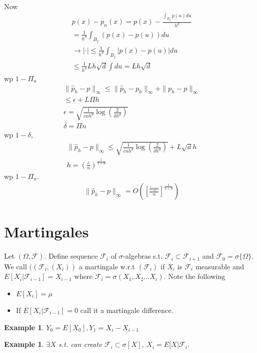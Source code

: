 \documentclass[10pt]{article}
\newtheorem{example}[ex]{Example}
\renewcommand{\hat}{\widehat}
\begin{document}
Now 
\begin{align*}
p(x) - p_{n}(x) = p(x) - \frac{\int_{B_{j}}p(u)du } {h^{d}} \\
                     = \frac{1}{h^{d}}\int_{B_{j}}(p(x) - p(u))du \\
\rightarrow |\cdot | \le \frac{1}{h^{d}}\int_{B_{j}}|p(x)-p(u)|du \\
\le \frac{1}{h^{d}}Lh\sqrt{d}\int du = Lh\sqrt{d}
\end{align*}
wp $1- \Pi_{n}$
\begin{align*}
\|\hat{p}_{h} - p \|_{\infty} \le \|\hat{p}_{h} - p_{h}\|_{\infty} + \| p_{h} - p \|_{\infty}\\ \le \epsilon + L\Pi h \\
\epsilon = \sqrt{ \frac{1}{cnh^{d}}\log(\frac{2}{\delta h^{d}})} \\
\delta = \Pi n
\end{align*}
wp $1- \delta$,
\begin{align*}
\|\hat{p}_{h} - p\|_{\infty} \le \sqrt{\frac{1}{cnh^{d}}\log(\frac{2}{\delta h^{d}})} + L\sqrt{d} h \\
h = (\frac{c}{n})^{\frac{1}{2+d}}
\end{align*}
wp $1 - \Pi_{n}$.
\begin{align*}
\|\hat{p}_{h} - p \|_{\infty} = O([\frac{log n}{n}]^{\frac{1}{2+d}})
\end{align*}

\section{Martingales}
Let $(\Omega, \mathscr{F})$. Define sequence $\mathscr{F}_{i}$ of $\sigma$-algebras s.t. $\mathscr{F}_{i} \subset \mathscr{F}_{i+1}$ and $\mathscr{F}_{0} = \sigma\{ \Omega\}$. We call $((\mathscr{F}_{i}, (X_{i}))$ a martingale w.r.t $(\mathscr{F}_{i})$ if $X_{i}$ is $\mathscr{F}_{i}$ measurable and $E[X_{i} | \mathscr{F}_{i-1}] = X_{i-1}$ where $\mathscr{F}_{i} = \sigma(X_{1},X_{2}...X_{i})$. Note the following 
\begin{itemize}
\item $ E[X_{i}] = \mu $
\item If $E[X_{i}|\mathscr{F}_{i-1}] = 0$ call it a martingale difference.
\end{itemize}

\begin{example}
$Y_{0} = E[X_{0}], Y_{1} = X_{i} - X_{i-1}$
\end{example}
\begin{example}
$\exists X$ s.t. can create $\mathscr{F}_{i} \subset \sigma[X]$, $X_{i} = E[X | \mathscr{F}_{i}$.
\end{example}
\end{document}
